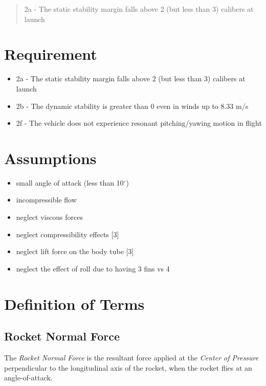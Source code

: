 \documentclass[]{book}
\providecommand{\tightlist}{%
  \setlength{\itemsep}{0pt}\setlength{\parskip}{0pt}}
\begin{document}
\begin{quote}
2a - The static stability margin falls above 2 (but less than 3)
calibers at launch
\end{quote}

\section{Requirement}\label{requirement}

\begin{itemize}
\tightlist
\item
  2a - The static stability margin falls above 2 (but less than 3)
  calibers at launch
\item
  2b - The dynamic stability is greater than 0 even in winds up to 8.33
  m/s
\item
  2f - The vehicle does not experience resonant pitching/yawing motion
  in flight
\end{itemize}

\section{Assumptions}\label{assumptions-2}

\begin{itemize}
\tightlist
\item
  small angle of attack (less than 10\(^\circ\))
\item
  incompressible flow
\item
  neglect viscous forces
\item
  neglect compressibility effects {[}3{]}
\item
  neglect lift force on the body tube {[}3{]}
\item
  neglect the effect of roll due to having 3 fins vs 4
\end{itemize}

\section{Definition of Terms}\label{definition-of-terms}

\subsection{Rocket Normal Force}\label{rocket-normal-force}

The \emph{Rocket Normal Force} is the resultant force applied at the
\emph{Center of Pressure} perpendicular to the longitudinal axis of the
rocket, when the rocket flies at an angle-of-attack.
\end{document}
